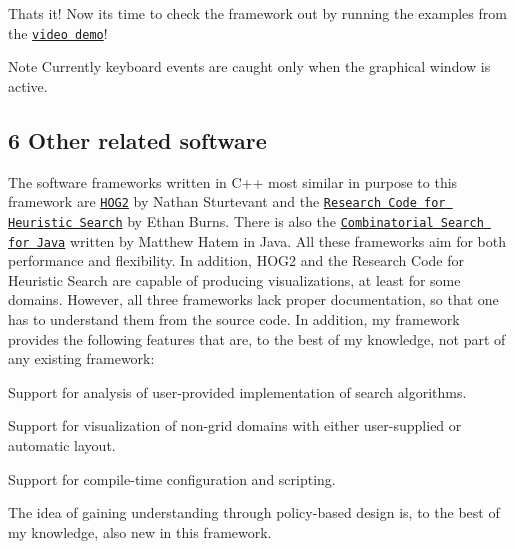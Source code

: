 That\textquotesingle{}s it! Now it\textquotesingle{}s time to check the framework out by running the examples from the \href{https://youtu.be/cElxLWve1Zw}{\tt video demo}! \begin{DoxyNote}{Note}
Currently keyboard events are caught only when the graphical window is active.
\end{DoxyNote}
\hypertarget{index_s-related}{}\subsection{6 Other related software}\label{index_s-related}
The software frameworks written in {\ttfamily C++} most similar in purpose to this framework are \href{https://github.com/nathansttt/hog2}{\tt H\+O\+G2} by Nathan Sturtevant and the \href{https://github.com/eaburns/search}{\tt Research Code for Heuristic Search} by Ethan Burns. There is also the \href{https://github.com/matthatem/cs4j}{\tt Combinatorial Search for Java} written by Matthew Hatem in {\ttfamily Java}. All these frameworks aim for both performance and flexibility. In addition, {\ttfamily H\+O\+G2} and the {\ttfamily Research Code for Heuristic Search} are capable of producing visualizations, at least for some domains. However, all three frameworks lack proper documentation, so that one has to understand them from the source code. In addition, my framework provides the following features that are, to the best of my knowledge, not part of any existing framework\+:
\begin{DoxyItemize}
\item Support for analysis of user-\/provided implementation of search algorithms.
\item Support for visualization of non-\/grid domains with either user-\/supplied or automatic layout.
\item Support for compile-\/time configuration and scripting.
\item The idea of gaining understanding through policy-\/based design is, to the best of my knowledge, also new in this framework.
\end{DoxyItemize}

